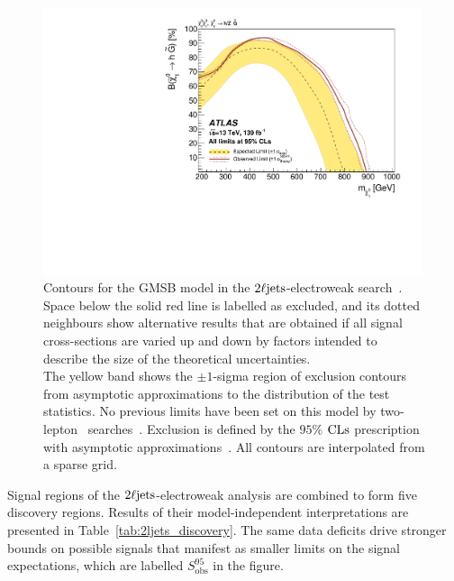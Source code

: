 \begin{figure}[tp]
\centering
\includegraphics[width=0.99\textwidth]{figures/2ljets_contours_gmsb.pdf}
\caption[
Contours for the GMSB model in the $\twoljets$-electroweak search
]{%
Contours for the GMSB model in the $\twoljets$-electroweak
search~\cite{atlas2022searches}.
\\[0.5em]
Space below the solid red line is labelled as excluded, and its dotted
neighbours show alternative results that are obtained if all signal
cross-sections are varied up and down by factors intended to describe the size
of the theoretical uncertainties.
\\[0.5em]
The yellow band shows the $\pm1$-sigma region of exclusion contours
from asymptotic approximations to the distribution of the test statistics.
No previous limits have been set on this model by two-lepton
\atlas\ searches~\cite{atlas_23l_SUSY_2016_24, atlas_2l_SUSY_2013_11}.
Exclusion is defined by the $95\%$ $\mathrm{CLs}$ prescription
with asymptotic approximations~\cite{Cowan:2010js}.
All contours are interpolated from a sparse grid.
}
\label{fig:2ljets_contours_gmsb}
\end{figure}

Signal regions of the $\twoljets$-electroweak analysis are combined to form
five discovery regions.
Results of their model-independent interpretations are presented in
Table~\ref{tab:2ljets_discovery}.
The same data deficits drive stronger bounds on possible signals that manifest
as smaller limits on the signal expectations, which are labelled
$S_{\mathrm{obs}}^{95}$ in the figure.

